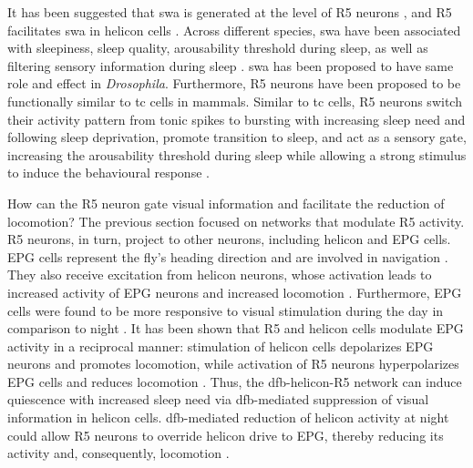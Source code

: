 \documentclass[../main.tex]{subfiles}
\begin{document}
It has been suggested that \gls{swa} is generated at the level of R5 neurons \parencite{raccugliaNetworkSpecificSynchronizationElectrical2019}, and R5 facilitates \gls{swa} in helicon cells \parencite{raccugliaCoherentMultilevelNetwork2022}. Across different species, \gls{swa} have been associated with sleepiness, sleep quality, arousability threshold during sleep, as well as filtering sensory information during sleep \parencite{suarez-grimaltNeuralArchitectureSleep2021,raccugliaNetworkSpecificSynchronizationElectrical2019,raccugliaCoherentMultilevelNetwork2022}.
\gls{swa} has been proposed to have same role and effect in \textit{Drosophila}. Furthermore, R5 neurons have been proposed to be functionally similar to \gls{tc} cells in mammals. Similar to \gls{tc} cells, R5 neurons switch their activity pattern from tonic spikes to bursting  with increasing sleep need and following sleep deprivation, promote transition to sleep, and act as a sensory gate, increasing the arousability threshold during sleep while allowing a strong stimulus to induce the behavioural response
\parencite{
    suarez-grimaltNeuralArchitectureSleep2021,
    raccugliaNetworkSpecificSynchronizationElectrical2019,
    raccugliaCoherentMultilevelNetwork2022,
    yanSubtypeSpecificRolesEllipsoid2023,
    gentThalamicDualControl2018}.

How can the R5 neuron gate visual information and facilitate the reduction of locomotion? The previous section focused on networks that modulate R5 activity. R5 neurons, in turn, project to other neurons, including helicon and EPG cells. EPG cells represent the fly's heading direction and are involved in navigation \parencite{raccugliaCoherentMultilevelNetwork2022}. They also receive excitation from helicon neurons, whose activation leads to increased activity of EPG neurons and increased locomotion \parencite{raccugliaCoherentMultilevelNetwork2022}.
Furthermore, EPG cells were found to be more responsive to visual stimulation during the day in comparison to night \parencite{raccugliaCoherentMultilevelNetwork2022}.
It has been shown that R5 and helicon cells modulate EPG activity in a reciprocal manner: stimulation of helicon cells depolarizes EPG neurons and promotes locomotion, while activation of R5 neurons hyperpolarizes EPG cells and reduces locomotion \parencite{raccugliaCoherentMultilevelNetwork2022}. Thus, the \gls{dfb}-helicon-R5 network can induce quiescence with increased sleep need via \gls{dfb}-mediated suppression of visual information in helicon cells.
\gls{dfb}-mediated reduction of helicon activity at night could allow R5 neurons to override helicon drive to EPG, thereby reducing its activity and, consequently, locomotion \parencite{raccugliaCoherentMultilevelNetwork2022}.
\end{document}
